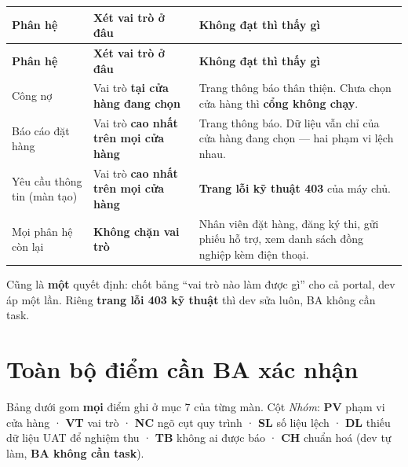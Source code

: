 {\footnotesize
\begin{longtable}{@{}L{4.0cm}L{4.4cm}L{6.6cm}@{}}
\textbf{Phân hệ} & \textbf{Xét vai trò ở đâu} & \textbf{Không đạt thì thấy gì}\\
\midrule \endfirsthead
{}\textbf{Phân hệ} & \textbf{Xét vai trò ở đâu} & \textbf{Không đạt thì thấy gì}\\
\midrule \endhead
Công nợ & Vai trò \textbf{tại cửa hàng đang chọn} & Trang thông báo thân thiện. Chưa chọn cửa hàng thì \textbf{cổng không chạy}. \\
Báo cáo đặt hàng & Vai trò \textbf{cao nhất trên mọi cửa hàng} & Trang thông báo. Dữ liệu vẫn chỉ của cửa hàng đang chọn --- hai phạm vi lệch nhau. \\
Yêu cầu thông tin (màn tạo) & Vai trò \textbf{cao nhất trên mọi cửa hàng} & \textbf{Trang lỗi kỹ thuật 403} của máy chủ. \\
Mọi phân hệ còn lại & \textbf{Không chặn vai trò} & Nhân viên đặt hàng, đăng ký thi, gửi phiếu hỗ trợ, xem danh sách đồng nghiệp kèm điện thoại. \\
\end{longtable}}

\begin{ask}
Cũng là \textbf{một} quyết định: chốt bảng ``vai trò nào làm được gì'' cho cả portal, dev áp
một lần. Riêng \textbf{trang lỗi 403 kỹ thuật} thì dev sửa luôn, BA không cần task.
\end{ask}

\section{Toàn bộ điểm cần BA xác nhận}

Bảng dưới gom \textbf{mọi} điểm ghi ở mục 7 của từng màn. Cột \emph{Nhóm}: \textbf{PV} phạm vi
cửa hàng · \textbf{VT} vai trò · \textbf{NC} ngõ cụt quy trình · \textbf{SL} số liệu lệch ·
\textbf{DL} thiếu dữ liệu UAT để nghiệm thu · \textbf{TB} không ai được báo ·
\textbf{CH} chuẩn hoá (dev tự làm, \textbf{BA không cần task}).

